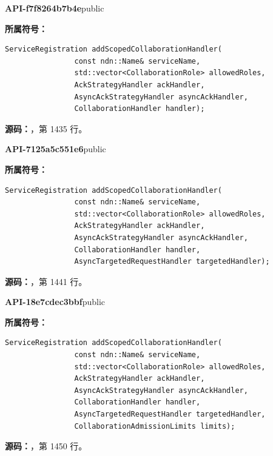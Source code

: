 \textbf{API-f7f8264b7b4e}\quad public\par
\textbf{所属符号：}\par
\begin{Verbatim}[fontsize=\footnotesize,breaklines,breakanywhere]
ServiceRegistration addScopedCollaborationHandler(
                const ndn::Name& serviceName,
                std::vector<CollaborationRole> allowedRoles,
                AckStrategyHandler ackHandler,
                AsyncAckStrategyHandler asyncAckHandler,
                CollaborationHandler handler);
\end{Verbatim}
\textbf{源码：}，第 1435 行。\par

\textbf{API-7125a5c551e6}\quad public\par
\textbf{所属符号：}\par
\begin{Verbatim}[fontsize=\footnotesize,breaklines,breakanywhere]
ServiceRegistration addScopedCollaborationHandler(
                const ndn::Name& serviceName,
                std::vector<CollaborationRole> allowedRoles,
                AckStrategyHandler ackHandler,
                AsyncAckStrategyHandler asyncAckHandler,
                CollaborationHandler handler,
                AsyncTargetedRequestHandler targetedHandler);
\end{Verbatim}
\textbf{源码：}，第 1441 行。\par

\textbf{API-18e7cdec3bbf}\quad public\par
\textbf{所属符号：}\par
\begin{Verbatim}[fontsize=\footnotesize,breaklines,breakanywhere]
ServiceRegistration addScopedCollaborationHandler(
                const ndn::Name& serviceName,
                std::vector<CollaborationRole> allowedRoles,
                AckStrategyHandler ackHandler,
                AsyncAckStrategyHandler asyncAckHandler,
                CollaborationHandler handler,
                AsyncTargetedRequestHandler targetedHandler,
                CollaborationAdmissionLimits limits);
\end{Verbatim}
\textbf{源码：}，第 1450 行。\par


